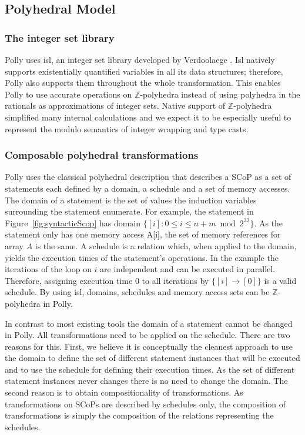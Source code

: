 \subsection{Polyhedral Model}

\subsubsection{The integer set library} Polly uses isl, an integer set library
developed by Verdoolaege \cite{Verdoolaege10}. Isl natively supports
existentially quantified variables in all its data structures; therefore, Polly
also supports them throughout the whole transformation. This enables Polly to
use accurate operations on $\mathbb{Z}$-polyhedra instead of using polyhedra
in the rationals as approximations of integer sets.
Native support of $\mathbb{Z}$-polyhedra
simplified many internal calculations and we
expect it to be especially useful to represent the modulo semantics of integer
wrapping and type casts.


\subsubsection{Composable polyhedral transformations}
Polly uses the classical polyhedral description \cite{girbal}
that describes a SCoP as a
set of statements each defined by a domain, a schedule and a set of memory
accesses. The domain of a statement is the set of values the induction
variables surrounding the statement enumerate. For example, the statement in
Figure~\ref{fig:syntacticScop} has domain $\{[i]: 0\leq i\leq n+m\bmod 2^{32}\}$.
As the statement only has one memory access A[i], the set of memory
references for array $A$ is the same. A schedule is a relation which, when
applied to the domain, yields the execution times of the statement's
operations. In the example the iterations of the loop on $i$ are independent and
can be executed in parallel. Therefore, assigning execution time 0 to all
iterations by $\{[i] \rightarrow [0]\}$ is a valid schedule. By using isl, domains,
schedules and memory access sets can be $\mathbb{Z}$-polyhedra in Polly.

In contrast to most existing tools the domain of a statement cannot be changed
in Polly. All transformations need to be applied on the schedule. There
are two reasons for this. First, we believe it is
conceptually the cleanest approach to use the domain to define the set of
different statement instances that will be executed and to use the schedule for
defining their execution times. As the set of different statement instances
never changes there is no need to change the domain. The second reason is to
obtain compositionality of transformations. As transformations on SCoPs are
described by schedules only, the composition of transformations is simply the
composition of the relations representing the schedules.

